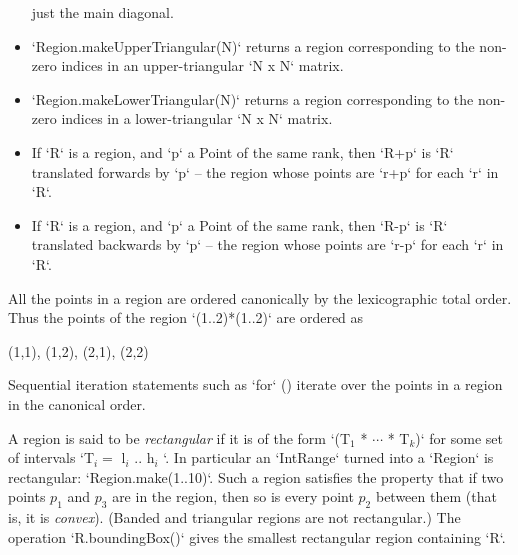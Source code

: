 \begin{itemize}
      just the main diagonal.
\item \xcd`Region.makeUpperTriangular(N)` returns a region corresponding
to the non-zero indices in an upper-triangular \xcd`N x N` matrix.
\item \xcd`Region.makeLowerTriangular(N)` returns a region corresponding
to the non-zero indices in a lower-triangular \xcd`N x N` matrix.
\item 
  If \xcd`R` is a region, and \xcd`p` a Point of the same rank, then 
  \xcd`R+p` is \xcd`R` translated forwards by 
  \xcd`p` -- the region whose
  points are \xcd`r+p` 
  for each \xcd`r` in \xcd`R`.
\item 
  If \xcd`R` is a region, and \xcd`p` a Point of the same rank, then 
  \xcd`R-p` is \xcd`R` translated backwards by 
  \xcd`p` -- the region whose
  points are \xcd`r-p` 
  for each \xcd`r` in \xcd`R`.

\end{itemize}

All the points in a region are ordered canonically by the
lexicographic total order. Thus the points of the region \xcd`(1..2)*(1..2)`
are ordered as 
\begin{xten}
(1,1), (1,2), (2,1), (2,2)
\end{xten}
Sequential iteration statements such as \xcd`for` ()
iterate over the points in a region in the canonical order.

A region is said to be {\em rectangular} if it is of
the form \xcdmath`(T$_1$ * $\cdots$ * T$_k$)` for some set of intervals
\xcdmath`T$_i = $ l$_i$ .. h$_i$ `. 
In particular an \xcd`IntRange` turned into a \xcd`Region` is rectangular: 
\xcd`Region.make(1..10)`.
Such a
region satisfies the property that if two points $p_1$ and $p_3$ are
in the region, then so is every point $p_2$ between them (that is, it is {\em convex}). 
(Banded and triangular regions are not rectangular.)
The operation
\xcd`R.boundingBox()` gives the smallest rectangular region containing
\xcd`R`.

